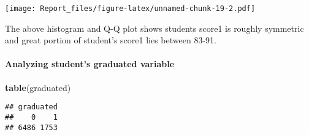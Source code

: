 \documentclass[
]{article}
\newenvironment{Shaded}{\begin{snugshade}}{\end{snugshade}}
\newcommand{\DataTypeTok}[1]{\textcolor[rgb]{0.13,0.29,0.53}{#1}}
\newcommand{\DecValTok}[1]{\textcolor[rgb]{0.00,0.00,0.81}{#1}}
\newcommand{\KeywordTok}[1]{\textcolor[rgb]{0.13,0.29,0.53}{\textbf{#1}}}
\newcommand{\NormalTok}[1]{#1}
\newcommand{\OperatorTok}[1]{\textcolor[rgb]{0.81,0.36,0.00}{\textbf{#1}}}
\newcommand{\StringTok}[1]{\textcolor[rgb]{0.31,0.60,0.02}{#1}}
\begin{document}
\begin{Shaded}
\end{Shaded}

\texttt{[image: Report\_files/figure-latex/unnamed-chunk-19-2.pdf]}

The above histogram and Q-Q plot shows students score1 is roughly
symmetric and great portion of student's score1 lies between 83-91.

\hypertarget{analyzing-students-graduated-variable}{%
\paragraph{Analyzing student's graduated
variable}\label{analyzing-students-graduated-variable}}

\begin{Shaded}
\begin{Highlighting}[]
\KeywordTok{table}\NormalTok{(graduated)}
\end{Highlighting}
\end{Shaded}

\begin{verbatim}
## graduated
##    0    1 
## 6486 1753
\end{verbatim}
\end{document}
